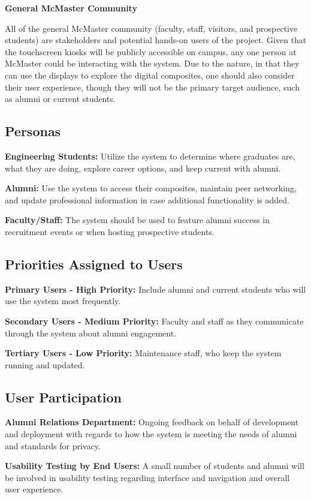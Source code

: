 \documentclass[12pt]{article}
\begin{document}
\textbf{General McMaster Community} \par
All of the general McMaster community (faculty, staff, visitors, and prospective students) are stakeholders and potential hands-on users of the project. Given that the touchscreen kiosks will be publicly accessible on campus, any one person at McMaster could be interacting with the system. Due to the nature, in that they can use the displays to explore the digital composites, one should also consider their user experience, though they will not be the primary target audience, such as alumni or current students.

\subsection{Personas}
\textbf{Engineering Students:} Utilize the system to determine where graduates are, what they are doing, explore career options, and keep current with alumni. \par
\textbf{Alumni:} Use the system to access their composites, maintain peer networking, and update professional information in case additional functionality is added. \par
\textbf{Faculty/Staff:} The system should be used to feature alumni success in recruitment events or when hosting prospective students.

\subsection{Priorities Assigned to Users}
\textbf{Primary Users - High Priority:} Include alumni and current students who will use the system most frequently. \par
\textbf{Secondary Users - Medium Priority:} Faculty and staff as they communicate through the system about alumni engagement. \par
\textbf{Tertiary Users - Low Priority:} Maintenance staff, who keep the system running and updated.

\subsection{User Participation}
\textbf{Alumni Relations Department:} Ongoing feedback on behalf of development and deployment with regards to how the system is meeting the needs of alumni and standards for privacy. \par
\textbf{Usability Testing by End Users:} A small number of students and alumni will be involved in usability testing regarding interface and navigation and overall user experience.
\end{document}
